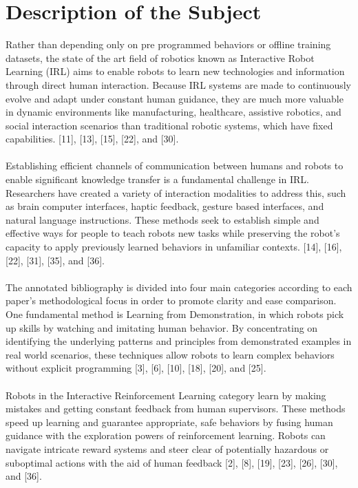 \documentclass[report.tex]{subfiles}
\begin{document}
    \chapter{Description of the Subject}
Rather than depending only on pre programmed behaviors or offline training datasets, the state of the art field of robotics known as Interactive Robot Learning (IRL) aims to enable robots to learn new technologies and information through direct human interaction.  Because IRL systems are made to continuously evolve and adapt under constant human guidance, they are much more valuable in dynamic environments like manufacturing, healthcare, assistive robotics, and social interaction scenarios than traditional robotic systems, which have fixed capabilities.  [11], [13], [15], [22], and [30].\\
 \\Establishing efficient channels of communication between humans and robots to enable significant knowledge transfer is a fundamental challenge in IRL.  Researchers have created a variety of interaction modalities to address this, such as brain computer interfaces, haptic feedback, gesture based interfaces, and natural language instructions.  These methods seek to establish simple and effective ways for people to teach robots new tasks while preserving the robot's capacity to apply previously learned behaviors in unfamiliar contexts.  [14], [16], [22], [31], [35], and [36].\\\\
 The annotated bibliography is divided into four main categories according to each paper's methodological focus in order to promote clarity and ease comparison.  One fundamental method is Learning from Demonstration, in which robots pick up skills by watching and imitating human behavior.  By concentrating on identifying the underlying patterns and principles from demonstrated examples in real world scenarios, these techniques allow robots to learn complex behaviors without explicit programming [3], [6], [10], [18], [20], and [25].\\\\
 Robots in the Interactive Reinforcement Learning category learn by making mistakes and getting constant feedback from human supervisors.  These methods speed up learning and guarantee appropriate, safe behaviors by fusing human guidance with the exploration powers of reinforcement learning.  Robots can navigate intricate reward systems and steer clear of potentially hazardous or suboptimal actions with the aid of human feedback [2], [8], [19], [23], [26], [30], and [36].\\\\
\end{document}
